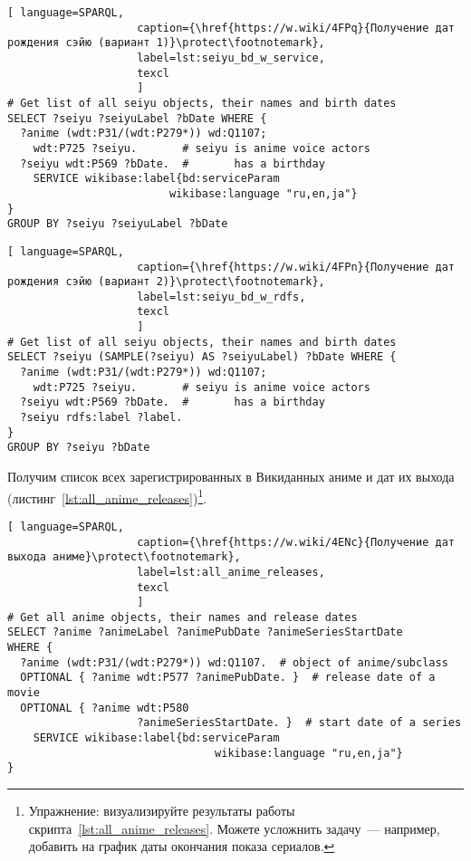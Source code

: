 \begin{lstlisting}[ language=SPARQL, 
                    caption={\href{https://w.wiki/4FPq}{Получение дат рождения сэйю (вариант 1)}\protect\footnotemark},
                    label=lst:seiyu_bd_w_service,
                    texcl 
                    ]
# Get list of all seiyu objects, their names and birth dates
SELECT ?seiyu ?seiyuLabel ?bDate WHERE {
  ?anime (wdt:P31/(wdt:P279*)) wd:Q1107;
    wdt:P725 ?seiyu.       # seiyu is anime voice actors
  ?seiyu wdt:P569 ?bDate.  #       has a birthday
    SERVICE wikibase:label{bd:serviceParam
					     wikibase:language "ru,en,ja"}
}
GROUP BY ?seiyu ?seiyuLabel ?bDate
\end{lstlisting}%

\begin{lstlisting}[ language=SPARQL, 
                    caption={\href{https://w.wiki/4FPn}{Получение дат рождения сэйю (вариант 2)}\protect\footnotemark},
                    label=lst:seiyu_bd_w_rdfs,
                    texcl 
                    ]
# Get list of all seiyu objects, their names and birth dates
SELECT ?seiyu (SAMPLE(?seiyu) AS ?seiyuLabel) ?bDate WHERE {
  ?anime (wdt:P31/(wdt:P279*)) wd:Q1107;
    wdt:P725 ?seiyu.       # seiyu is anime voice actors
  ?seiyu wdt:P569 ?bDate.  #       has a birthday 
  ?seiyu rdfs:label ?label.
}
GROUP BY ?seiyu ?bDate
\end{lstlisting}%

Получим список всех зарегистрированных в Викиданных аниме и дат их выхода (листинг~\ref{lst:all_anime_releases})\footnote{Упражнение: визуализируйте результаты работы скрипта~\ref{lst:all_anime_releases}. Можете усложнить задачу~--- например, добавить на график даты окончания показа сериалов.}.

\begin{lstlisting}[ language=SPARQL, 
                    caption={\href{https://w.wiki/4ENc}{Получение дат выхода аниме}\protect\footnotemark},
                    label=lst:all_anime_releases,
                    texcl 
                    ]
# Get all anime objects, their names and release dates
SELECT ?anime ?animeLabel ?animePubDate ?animeSeriesStartDate
WHERE {
  ?anime (wdt:P31/(wdt:P279*)) wd:Q1107.  # object of anime/subclass
  OPTIONAL { ?anime wdt:P577 ?animePubDate. }  # release date of a movie
  OPTIONAL { ?anime wdt:P580
					?animeSeriesStartDate. }  # start date of a series
    SERVICE wikibase:label{bd:serviceParam
					     		wikibase:language "ru,en,ja"}
}
\end{lstlisting}%

